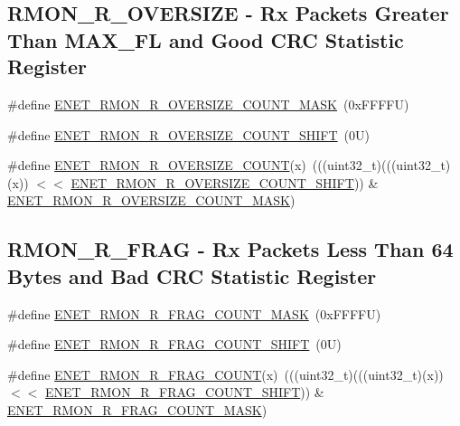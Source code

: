 \subsection*{R\+M\+O\+N\+\_\+\+R\+\_\+\+O\+V\+E\+R\+S\+I\+ZE -\/ Rx Packets Greater Than M\+A\+X\+\_\+\+FL and Good C\+RC Statistic Register}
\begin{DoxyCompactItemize}
\item 
\#define \mbox{\hyperlink{group___e_n_e_t___register___masks_ga3d8f160025d5d600fd7206e6fc762fc1}{E\+N\+E\+T\+\_\+\+R\+M\+O\+N\+\_\+\+R\+\_\+\+O\+V\+E\+R\+S\+I\+Z\+E\+\_\+\+C\+O\+U\+N\+T\+\_\+\+M\+A\+SK}}~(0x\+F\+F\+F\+F\+U)
\item 
\#define \mbox{\hyperlink{group___e_n_e_t___register___masks_ga3e279c65a9e7d91eef6b4f228c028f47}{E\+N\+E\+T\+\_\+\+R\+M\+O\+N\+\_\+\+R\+\_\+\+O\+V\+E\+R\+S\+I\+Z\+E\+\_\+\+C\+O\+U\+N\+T\+\_\+\+S\+H\+I\+FT}}~(0\+U)
\item 
\#define \mbox{\hyperlink{group___e_n_e_t___register___masks_gac5c81ea4fdcc881701c632c99e58a341}{E\+N\+E\+T\+\_\+\+R\+M\+O\+N\+\_\+\+R\+\_\+\+O\+V\+E\+R\+S\+I\+Z\+E\+\_\+\+C\+O\+U\+NT}}(x)~(((uint32\+\_\+t)(((uint32\+\_\+t)(x)) $<$$<$ \mbox{\hyperlink{group___e_n_e_t___register___masks_ga3e279c65a9e7d91eef6b4f228c028f47}{E\+N\+E\+T\+\_\+\+R\+M\+O\+N\+\_\+\+R\+\_\+\+O\+V\+E\+R\+S\+I\+Z\+E\+\_\+\+C\+O\+U\+N\+T\+\_\+\+S\+H\+I\+FT}})) \& \mbox{\hyperlink{group___e_n_e_t___register___masks_ga3d8f160025d5d600fd7206e6fc762fc1}{E\+N\+E\+T\+\_\+\+R\+M\+O\+N\+\_\+\+R\+\_\+\+O\+V\+E\+R\+S\+I\+Z\+E\+\_\+\+C\+O\+U\+N\+T\+\_\+\+M\+A\+SK}})
\end{DoxyCompactItemize}
\subsection*{R\+M\+O\+N\+\_\+\+R\+\_\+\+F\+R\+AG -\/ Rx Packets Less Than 64 Bytes and Bad C\+RC Statistic Register}
\begin{DoxyCompactItemize}
\item 
\#define \mbox{\hyperlink{group___e_n_e_t___register___masks_ga5f5c83f39cebf731ec8d463d94ce3f03}{E\+N\+E\+T\+\_\+\+R\+M\+O\+N\+\_\+\+R\+\_\+\+F\+R\+A\+G\+\_\+\+C\+O\+U\+N\+T\+\_\+\+M\+A\+SK}}~(0x\+F\+F\+F\+F\+U)
\item 
\#define \mbox{\hyperlink{group___e_n_e_t___register___masks_ga5ef532dea7d45ccc23afff7d7c17c16f}{E\+N\+E\+T\+\_\+\+R\+M\+O\+N\+\_\+\+R\+\_\+\+F\+R\+A\+G\+\_\+\+C\+O\+U\+N\+T\+\_\+\+S\+H\+I\+FT}}~(0\+U)
\item 
\#define \mbox{\hyperlink{group___e_n_e_t___register___masks_ga83e66016eed8916198ebd6604af4e1aa}{E\+N\+E\+T\+\_\+\+R\+M\+O\+N\+\_\+\+R\+\_\+\+F\+R\+A\+G\+\_\+\+C\+O\+U\+NT}}(x)~(((uint32\+\_\+t)(((uint32\+\_\+t)(x)) $<$$<$ \mbox{\hyperlink{group___e_n_e_t___register___masks_ga5ef532dea7d45ccc23afff7d7c17c16f}{E\+N\+E\+T\+\_\+\+R\+M\+O\+N\+\_\+\+R\+\_\+\+F\+R\+A\+G\+\_\+\+C\+O\+U\+N\+T\+\_\+\+S\+H\+I\+FT}})) \& \mbox{\hyperlink{group___e_n_e_t___register___masks_ga5f5c83f39cebf731ec8d463d94ce3f03}{E\+N\+E\+T\+\_\+\+R\+M\+O\+N\+\_\+\+R\+\_\+\+F\+R\+A\+G\+\_\+\+C\+O\+U\+N\+T\+\_\+\+M\+A\+SK}})
\end{DoxyCompactItemize}
